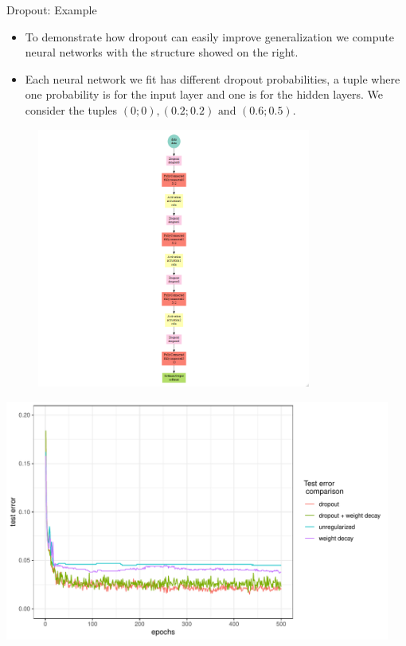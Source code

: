 \begin{vbframe}{Dropout: Example}
\begin{minipage}{0.5\textwidth}
  \begin{itemize}
    \item To demonstrate how dropout can easily improve generalization we compute neural networks with the structure showed on the right.
    \item Each neural network we fit has different dropout probabilities, a tuple where one probability is for the input layer and one is for the hidden layers. We consider the tuples $(0;0) , (0.2;0.2) \text{ and } (0.6;0.5)$.
  \end{itemize}
  \end{minipage}
  \begin{minipage}{0.45\textwidth}
  \begin{figure}
    \centering
    \vspace{-0.5cm}
      \includegraphics[width=9cm]{figure/mxnet_graph_dropout.png}
  \end{figure}
  \end{minipage}
\framebreak

\begin{knitrout}\scriptsize
{}\color{fgcolor}

{\centering \includegraphics[width=0.95\textwidth]{figure/unnamed-chunk-3-1} 

}
\end{knitrout}
\end{vbframe}
